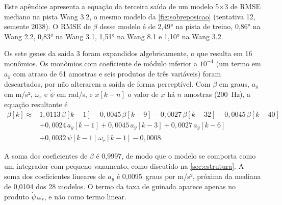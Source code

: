 \label{apen:equacao_beta}

Este apêndice apresenta a equação da terceira saída de um modelo 5×3 de RMSE mediano na pista Wang 3.2, o mesmo modelo da \autoref{fig:sobreposicao} (tentativa 12, semente 2038). O RMSE de $\beta$ desse modelo é de 2,49° na pista de treino, 0,86° na Wang 2.2, 0,83° na Wang 3.1, 1,51° na Wang 8.1 e 1,10° na Wang 3.2.

Os sete genes da saída 3 foram expandidos algebricamente, o que resulta em 16 monômios. Os monômios com coeficiente de módulo inferior a $10^{-4}$ (um termo em $a_y$ com atraso de 61 amostras e seis produtos de três variáveis) foram descartados, por não alterarem a saída de forma perceptível. Com $\beta$ em graus, $a_y$ em m/s², $\omega_r$ e $\dot\psi$ em rad/s, e $x[k-n]$ o valor de $x$ há $n$ amostras (200~Hz), a equação resultante é
\begin{align}
    \beta[k] \approx{}& 1{,}0113\,\beta[k-1] - 0{,}0045\,\beta[k-9] - 0{,}0027\,\beta[k-32] - 0{,}0045\,\beta[k-40] \nonumber\\
    &+ 0{,}0024\,a_y[k-1] + 0{,}0045\,a_y[k-3] + 0{,}0027\,a_y[k-6] \nonumber\\
    &+ 0{,}0032\,\dot\psi[k-1]\,\omega_r[k-1] - 0{,}0008.
    \label{eq:beta_modelo_tipico}
\end{align}

A soma dos coeficientes de $\beta$ é 0,9997, de modo que o modelo se comporta como um integrador com pequeno vazamento, como discutido na \autoref{sec:estrutura}. A soma dos coeficientes lineares de $a_y$ é 0,0095~graus por m/s², próxima da mediana de 0,0104 dos 28 modelos. O termo da taxa de guinada aparece apenas no produto $\dot\psi\,\omega_r$, e não como termo linear.
